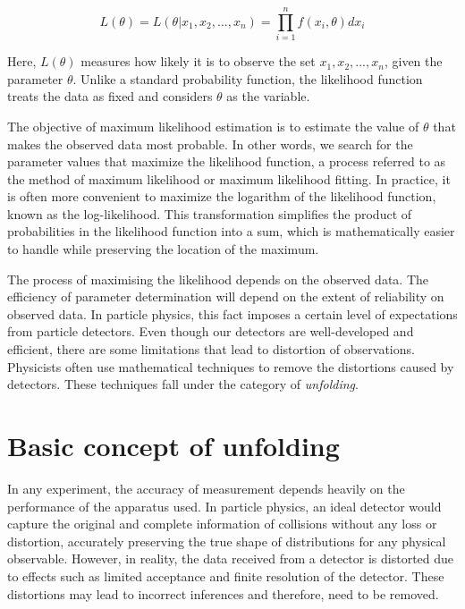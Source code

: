 \begin{equation}
    L (\theta) = L(\theta | x_1,x_2,...,x_n) = \prod_{i=1}^{n} f (x_i,\theta)dx_i
    \label{eqn:likeli}
\end{equation}


Here, $L(\theta)$ measures how likely it is to observe the set ${x_1,x_2,...,x_n}$, given the 
parameter $\theta$. Unlike a standard probability function, the likelihood function treats the 
data as fixed and considers $\theta$ as the variable.

The objective of maximum likelihood estimation is to estimate the value of 
$\theta$ that makes the observed data most probable. In other words, we search for the parameter 
values that maximize the likelihood function, a process referred to as the method of maximum 
likelihood or maximum likelihood fitting. In practice, it is often more convenient to maximize the 
logarithm of the likelihood function, known as the log-likelihood. This transformation simplifies the 
product of probabilities in the likelihood function into a sum, which is mathematically easier to 
handle while preserving the location of the maximum.

The process of maximising the likelihood depends on the observed data. The efficiency of parameter determination
will depend on the extent of reliability on observed data. In particle physics, this fact imposes a 
certain level of expectations from particle detectors. Even though our detectors are well-developed
and efficient, there are some limitations that lead to distortion of observations. Physicists often use
mathematical techniques to remove the distortions caused by detectors. These techniques fall under the
category of \textit{unfolding}.  

\section{Basic concept of unfolding}

In any experiment, the accuracy of measurement depends heavily on the performance of the apparatus 
used. In particle physics, an ideal detector would capture the original and complete information 
of collisions without any loss or distortion, accurately preserving the true shape
of distributions for any physical observable. However, in reality, the data received 
from a detector is distorted due to effects such as limited acceptance and 
finite resolution of the detector. These distortions may lead to incorrect inferences and
therefore, need to be removed.

